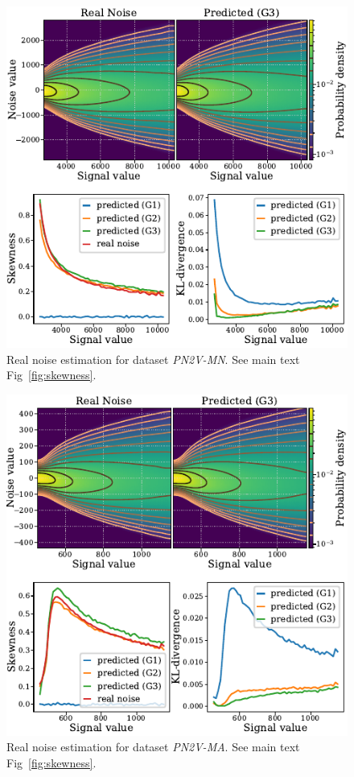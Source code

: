 \documentclass{article}
\begin{document}
\begin{figure}[ht]
\begin{center}
\centerline{\includegraphics[width=\columnwidth]{fig_skewness_pn2v-MN.pdf}}
\caption{Real noise estimation for dataset \textit{PN2V-MN}. See main text Fig~\ref{fig:skewness}.
}
\end{center}
\vskip -0.2in
\end{figure}

\begin{figure}[ht]
\begin{center}
\centerline{\includegraphics[width=\columnwidth]{fig_skewness_pn2v-MA.pdf}}
\caption{Real noise estimation for dataset \textit{PN2V-MA}. See main text Fig~\ref{fig:skewness}.
}
\end{center}
\vskip -0.2in
\end{figure}
\end{document}
